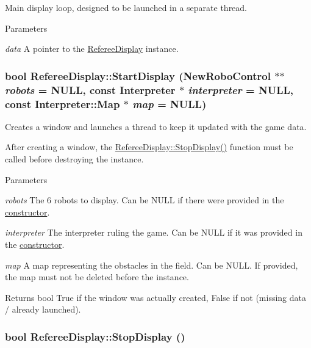 Main display loop, designed to be launched in a separate thread. 


\begin{DoxyParams}{Parameters}
\item[{\em data}]A pointer to the \hyperlink{classRefereeDisplay}{RefereeDisplay} instance. \end{DoxyParams}
\hypertarget{classRefereeDisplay_a6b789ef1ca73c72556cf5051a8a2b5a6}{
\subsubsection[{StartDisplay}]{\setlength{\rightskip}{0pt plus 5cm}bool RefereeDisplay::StartDisplay ({\bf NewRoboControl} $\ast$$\ast$ {\em robots} = {\ttfamily NULL}, \/  const {\bf Interpreter} $\ast$ {\em interpreter} = {\ttfamily NULL}, \/  const {\bf Interpreter::Map} $\ast$ {\em map} = {\ttfamily NULL})}}
\label{classRefereeDisplay_a6b789ef1ca73c72556cf5051a8a2b5a6}


Creates a window and launches a thread to keep it updated with the game data. 

After creating a window, the \hyperlink{classRefereeDisplay_aafa710132ce88c4e6cb4d430baf26173}{RefereeDisplay::StopDisplay()} function must be called before destroying the instance.


\begin{DoxyParams}{Parameters}
\item[{\em robots}]The 6 robots to display. Can be NULL if there were provided in the \hyperlink{classRefereeDisplay_a8f7d4872a24b44b96a36a5bbf991f5d2}{constructor}. \item[{\em interpreter}]The interpreter ruling the game. Can be NULL if it was provided in the \hyperlink{classRefereeDisplay_a8f7d4872a24b44b96a36a5bbf991f5d2}{constructor}. \item[{\em map}]A map representing the obstacles in the field. Can be NULL. If provided, the map must not be deleted before the instance. \end{DoxyParams}
\begin{DoxyReturn}{Returns}
bool True if the window was actually created, False if not (missing data / already launched). 
\end{DoxyReturn}
\hypertarget{classRefereeDisplay_aafa710132ce88c4e6cb4d430baf26173}{
\subsubsection[{StopDisplay}]{\setlength{\rightskip}{0pt plus 5cm}bool RefereeDisplay::StopDisplay ()}}
\label{classRefereeDisplay_aafa710132ce88c4e6cb4d430baf26173}


